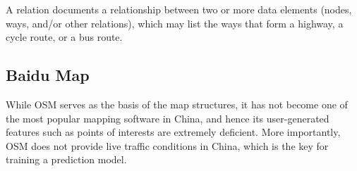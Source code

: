 A relation documents 
a relationship between two or more data elements 
(nodes, ways, and/or other relations), which may list the ways that form a highway, a cycle route, or a bus route. 


\subsection{Baidu Map}
While OSM serves as the basis of the map structures, it has not become one of the most popular mapping software in China, 
and hence its user-generated features such 
as points of interests are extremely deficient. 
More importantly, OSM does not provide live traffic 
conditions in China, which is the key for training a prediction
model. 


